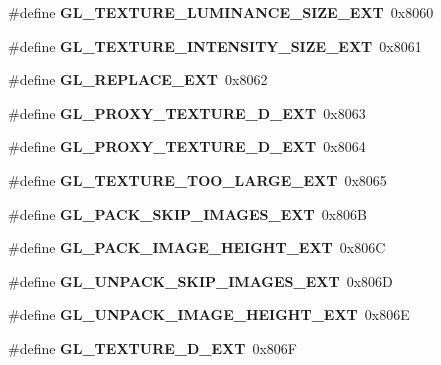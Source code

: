 \begin{DoxyCompactItemize}
\item 
\#define {\bfseries G\+L\+\_\+\+T\+E\+X\+T\+U\+R\+E\+\_\+\+L\+U\+M\+I\+N\+A\+N\+C\+E\+\_\+\+S\+I\+Z\+E\+\_\+\+E\+X\+T}~0x8060\label{_s_d_l__opengl_8h_a34e4d08be9b2a7e726cd205fbbc045da}

\item 
\#define {\bfseries G\+L\+\_\+\+T\+E\+X\+T\+U\+R\+E\+\_\+\+I\+N\+T\+E\+N\+S\+I\+T\+Y\+\_\+\+S\+I\+Z\+E\+\_\+\+E\+X\+T}~0x8061\label{_s_d_l__opengl_8h_ac3551932d44ce11eb20c280a3f143653}

\item 
\#define {\bfseries G\+L\+\_\+\+R\+E\+P\+L\+A\+C\+E\+\_\+\+E\+X\+T}~0x8062\label{_s_d_l__opengl_8h_af5fdcd50ac129c0392396f3487329fd3}

\item 
\#define {\bfseries G\+L\+\_\+\+P\+R\+O\+X\+Y\+\_\+\+T\+E\+X\+T\+U\+R\+E\+\_\+D\+\_\+\+E\+X\+T}~0x8063\label{_s_d_l__opengl_8h_a0f7b8078d91d963dbc06f91eccea89de}

\item 
\#define {\bfseries G\+L\+\_\+\+P\+R\+O\+X\+Y\+\_\+\+T\+E\+X\+T\+U\+R\+E\+\_\+D\+\_\+\+E\+X\+T}~0x8064\label{_s_d_l__opengl_8h_a6c3e3c1d45877ca8a0042652d67d02e9}

\item 
\#define {\bfseries G\+L\+\_\+\+T\+E\+X\+T\+U\+R\+E\+\_\+\+T\+O\+O\+\_\+\+L\+A\+R\+G\+E\+\_\+\+E\+X\+T}~0x8065\label{_s_d_l__opengl_8h_a3b7d50f04a14942a9056c72d66861fe0}

\item 
\#define {\bfseries G\+L\+\_\+\+P\+A\+C\+K\+\_\+\+S\+K\+I\+P\+\_\+\+I\+M\+A\+G\+E\+S\+\_\+\+E\+X\+T}~0x806\+B\label{_s_d_l__opengl_8h_a338f4a855bcfc0703e6c4d21ebc55a93}

\item 
\#define {\bfseries G\+L\+\_\+\+P\+A\+C\+K\+\_\+\+I\+M\+A\+G\+E\+\_\+\+H\+E\+I\+G\+H\+T\+\_\+\+E\+X\+T}~0x806\+C\label{_s_d_l__opengl_8h_adea424b22939de3d329f48c9b0e54a20}

\item 
\#define {\bfseries G\+L\+\_\+\+U\+N\+P\+A\+C\+K\+\_\+\+S\+K\+I\+P\+\_\+\+I\+M\+A\+G\+E\+S\+\_\+\+E\+X\+T}~0x806\+D\label{_s_d_l__opengl_8h_a0a2136ef67ffb905ff1734fdfa8485bf}

\item 
\#define {\bfseries G\+L\+\_\+\+U\+N\+P\+A\+C\+K\+\_\+\+I\+M\+A\+G\+E\+\_\+\+H\+E\+I\+G\+H\+T\+\_\+\+E\+X\+T}~0x806\+E\label{_s_d_l__opengl_8h_a41f32cfcec66a0595e7020637e2bf379}

\item 
\#define {\bfseries G\+L\+\_\+\+T\+E\+X\+T\+U\+R\+E\+\_\+D\+\_\+\+E\+X\+T}~0x806\+F\label{_s_d_l__opengl_8h_a1b6d77d52099ad70dcf664c9c28019e4}


\end{DoxyCompactItemize}
